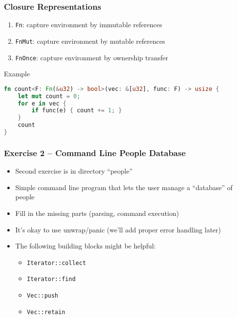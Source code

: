 \begin{frame}[fragile]
    \frametitle{Closure Representations}

    \begin{enumerate}
        \item \texttt{Fn}: capture environment by immutable references
        \item \texttt{FnMut}: capture environment by mutable references
        \item \texttt{FnOnce}: capture environment by ownership transfer
    \end{enumerate}

    \pause

    \begin{exampleblock}{Example}
    \begin{lstlisting}[language=rust]
fn count<F: Fn(&u32) -> bool>(vec: &[u32], func: F) -> usize {
    let mut count = 0;
    for e in vec {
        if func(e) { count += 1; }
    }
    count
}
    \end{lstlisting}
    \end{exampleblock}
\end{frame}

\begin{frame}[fragile]
    \frametitle{Exercise 2 -- Command Line People Database}

    \begin{itemize}
        \item Second exercise is in directory ``people''
        \item Simple command line program that lets the user manage a ``database'' of people
        \item Fill in the missing parts (parsing, command execution)
        \item It's okay to use unwrap/panic (we'll add proper error handling later)
        \item The following building blocks might be helpful:
        \begin{itemize}
            \item \texttt{Iterator::collect}
            \item \texttt{Iterator::find}
            \item \texttt{Vec::push}
            \item \texttt{Vec::retain}
        \end{itemize}
    \end{itemize}
\end{frame}
